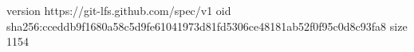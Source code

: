version https://git-lfs.github.com/spec/v1
oid sha256:cceddb9f1680a58c5d9fe61041973d81fd5306ce48181ab52f0f95c0d8c93fa8
size 1154
